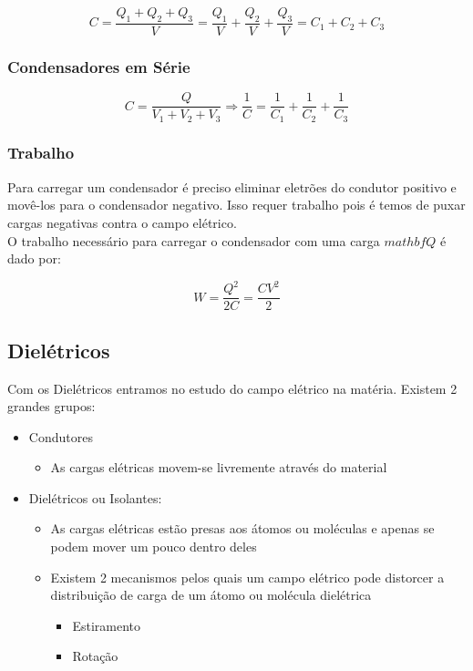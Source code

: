 \documentclass[11pt]{article}
\begin{document}
\[ C = \frac{Q_1+Q_2+Q_3}{V} 
     = \frac{Q_1}{V}+\frac{Q_2}{V}+\frac{Q_3}{V} 
     = C_1+C_2+C_3 \]

\subsubsection{Condensadores em Série}

\[ C = \frac{Q}{V_1+V_2+V_3} \Rightarrow \frac{1}{C}
     = \frac{1}{C_1}+\frac{1}{C_2}+\frac{1}{C_3} \]

\subsubsection{Trabalho}
Para carregar um condensador é preciso eliminar eletrões do condutor positivo e movê-los para o condensador negativo. Isso requer trabalho pois é temos de puxar cargas negativas contra o campo elétrico.\\[2pt]
O trabalho necessário para carregar o condensador com uma carga $mathbf{Q}$ é dado por:

\[ W = \frac{Q^2}{2C} = \frac{CV^2}{2} \]

\subsection{Dielétricos}

Com os Dielétricos entramos no estudo do campo elétrico na matéria. Existem 2 grandes grupos:

\begin{itemize}
    \item Condutores
    \begin{itemize}
        \item As cargas elétricas movem-se livremente através do material
    \end{itemize}
    \item Dielétricos ou Isolantes: 
    \begin{itemize}
        \item As cargas elétricas estão presas aos átomos ou moléculas e apenas se podem mover um pouco dentro deles
        \item Existem 2 mecanismos pelos quais um campo elétrico pode distorcer a distribuição de carga de um átomo ou molécula dielétrica
        \begin{itemize}
            \item Estiramento
            \item Rotação
        \end{itemize}
    \end{itemize}
\end{itemize}
\end{document}
